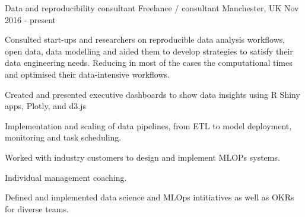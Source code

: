\begin{cventries}
\cventry
{Data and reproducibility consultant } %
{Freelance / consultant } %
{Manchester,  UK} %
{Nov 2016 - present } %
{ %
\begin{cvitems}
\item {Consulted start-ups and researchers on reproducible data analysis workflows, open data, data modelling and aided them to develop strategies to satisfy their data engineering needs. Reducing in most of the cases the computational times and optimised their data-intensive workflows.}
\item {Created and presented executive dashboards to show data insights using R Shiny apps, Plotly, and d3.js}
\item {Implementation and scaling of data pipelines, from ETL to model deployment, monitoring and task scheduling.}
\item{Worked with industry customers to design and implement MLOPs systems.}
\item {Individual management coaching.}
\item {Defined and implemented data science and MLOps intitiatives as well as OKRs for diverse teams.}
\end{cvitems}
}




\end{cventries}
